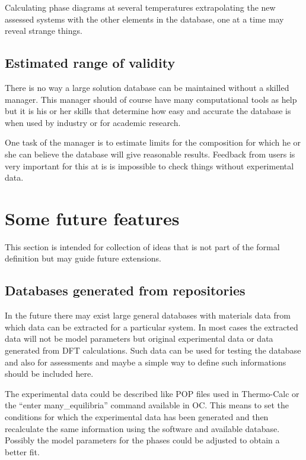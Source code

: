 \documentclass[12pt]{article}
\begin{document}
Calculating phase diagrams at several temperatures extrapolating the
new assessed systems with the other elements in the database, one at a
time may reveal strange things.

\subsection{Estimated range of validity}

There is no way a large solution database can be maintained without a
skilled manager.  This manager should of course have many
computational tools as help but it is his or her skills that determine
how easy and accurate the database is when used by industry or for
academic research.

One task of the manager is to estimate limits for the composition for
which he or she can believe the database will give reasonable results.
Feedback from users is very important for this at is is impossible to
check things without experimental data.

\section{Some future features}

This section is intended for collection of ideas that is not part of
the formal definition but may guide future extensions.

\subsection{Databases generated from repositories}

In the future there may exist large general databases with materials
data from which data can be extracted for a particular system.  In
most cases the extracted data will not be model parameters but
original experimental data or data generated from DFT calculations.
Such data can be used for testing the database and also for
assessments and maybe a simple way to define such informations should
be included here.

The experimental data could be described like POP files used in
Thermo-Calc or the ``enter many\_equilibria'' command available in OC.
This means to set the conditions for which the experimental data has
been generated and then recalculate the same information using the
software and available database.  Possibly the model parameters for
the phases could be adjusted to obtain a better fit.
\end{document}
